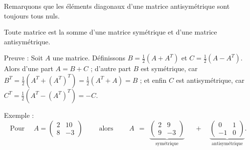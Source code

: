 \documentclass[class=report,crop=false]{standalone}
\begin{document}
Remarquons que les éléments diagonaux d'une matrice antisymétrique sont toujours tous nuls.

\begin{exemple}
Toute matrice est la somme d'une matrice symétrique et d'une matrice antisymétrique.

\medskip

Preuve :
Soit $A$ une matrice. Définissons $B=\frac12(A+A^T)$ et $C=\frac12(A-A^T)$.
Alors d'une part $A=B+C$ ; d'autre part $B$ est
symétrique, car $B^T=\frac12(A^T+(A^T)^T)=\frac12(A^T+A)=B$ ; et enfin $C$ est
antisymétrique, car $C^T=\frac12(A^T-(A^T)^T)=-C$.

Exemple :
$$\text{ Pour } \quad A=\begin{pmatrix} 2 & 10 \\ 8 & -3 \end{pmatrix}
\qquad\text{ alors }\qquad A \ \ = \ \ \underbrace{\begin{pmatrix}
2 & 9\\
9 & -3\end{pmatrix}}_{\text{symétrique}}
\quad\ \  + \quad \underbrace{\begin{pmatrix}
0 & 1\\
-1 & 0\end{pmatrix}}_{\text{antisymétrique}}.$$
\end{exemple}



\end{document}
